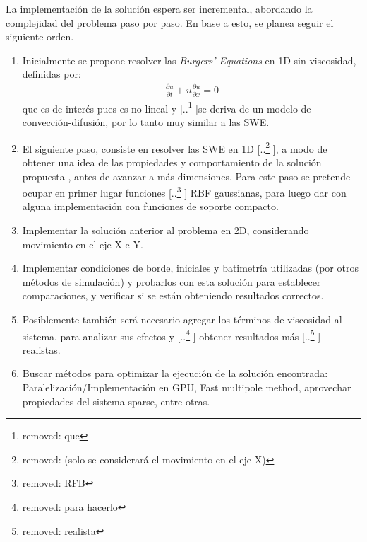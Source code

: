 \documentclass[spanish]{article} %
\providecommand{\DIFaddtex}[1]{{\protect\color{blue} \sf #1}} %
\providecommand{\DIFdeltex}[1]{{\protect\color{red} [..\footnote{removed: #1} ]}} %
\providecommand{\DIFaddbegin}{} %
\providecommand{\DIFaddend}{} %
\providecommand{\DIFdelbegin}{} %
\providecommand{\DIFdelend}{} %
\providecommand{\DIFadd}[1]{\texorpdfstring{\DIFaddtex{#1}}{#1}} %
\providecommand{\DIFdel}[1]{\texorpdfstring{\DIFdeltex{#1}}{}} %
\begin{document}
La implementación de la solución espera ser incremental, abordando la complejidad del problema paso por paso. En base a esto, se planea seguir el siguiente orden.

\begin{enumerate}
\item Inicialmente se propone resolver las \emph{Burgers' Equations} en 1D sin viscosidad, definidas por:
\DIFdelbegin %
\DIFdelend \DIFaddbegin \begin{align}
\frac{\partial u}{\partial t} + u\frac{\partial u}{\partial x} = 0
\label{eq:burger}
\end{align}
\DIFaddend que es de interés pues es no lineal y \DIFdelbegin \DIFdel{que }\DIFdelend se deriva de un modelo de convección-difusión, por lo tanto muy similar a las SWE.

\item El siguiente paso, consiste en resolver las SWE en 1D\DIFdelbegin \DIFdel{(solo se considerará el movimiento en el eje X)}\DIFdelend , a modo de obtener una idea de las propiedades y comportamiento de la solución propuesta\DIFaddbegin \DIFadd{, }\DIFaddend antes de avanzar a más dimensiones. Para este paso se pretende ocupar en primer lugar funciones \DIFdelbegin \DIFdel{RFB }\DIFdelend \DIFaddbegin \DIFadd{RBF }\DIFaddend gaussianas, para luego dar con alguna implementación con funciones de soporte compacto.

\item Implementar la solución anterior al problema en 2D, considerando movimiento en el eje X e Y.

\item Implementar condiciones de borde, iniciales y batimetría utilizadas (por otros métodos de simulación) y probarlos con esta solución para establecer comparaciones, y verificar si se están obteniendo resultados correctos.

\item Posiblemente también será necesario agregar los términos de viscosidad al sistema, para analizar sus efectos y \DIFdelbegin \DIFdel{para hacerlo }\DIFdelend \DIFaddbegin \DIFadd{obtener resultados }\DIFaddend más \DIFdelbegin \DIFdel{realista}\DIFdelend \DIFaddbegin \DIFadd{realistas}\DIFaddend .

\item Buscar métodos para optimizar la ejecución de la solución encontrada: Paralelización/Implementación en GPU, Fast multipole method, aprovechar propiedades del sistema sparse, entre otras.
\end{enumerate}
\end{document}

